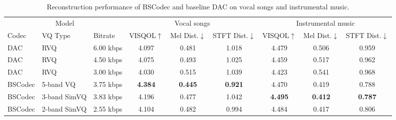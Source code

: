 \documentclass[11pt]{article}
\begin{document}
\begin{table}[h]
\centering
\small
\setlength{\tabcolsep}{4pt}
\caption{Reconstruction performance of BSCodec and baseline DAC on vocal songs and instrumental music.}
\vspace{-10pt}
\label{tab:music_instrument_results}
\begin{tabular}{lllcccccc}
\toprule
\multicolumn{3}{c}{Model} & \multicolumn{3}{c}{Vocal songs} & \multicolumn{3}{c}{Instrumental music} \\
\cmidrule(lr){1-3} \cmidrule(lr){4-6} \cmidrule(lr){7-9}
Codec & VQ Type & Bitrate & VISQOL$\uparrow$ & Mel Dist.$\downarrow$ & STFT Dist.$\downarrow$ & VISQOL$\uparrow$ & Mel Dist.$\downarrow$ & STFT Dist.$\downarrow$ \\
\midrule
DAC & RVQ & 6.00 kbps & 4.097 & 0.481 & 1.018 & 4.479 & 0.506 & 0.959 \\
DAC & RVQ & 4.50 kbps & 4.075 & 0.493 & 1.025 & 4.459 & 0.517 & 0.962
\\
DAC & RVQ & 3.00 kbps & 4.030 & 0.515 & 1.039 & 4.423 & 0.541 & 0.968
\\
BSCodec & 5-band VQ & 3.75 kbps & \textbf{4.384} & \textbf{0.445} & \textbf{0.921} & 4.470 & 0.419 & 0.788 \\
BSCodec & 3-band SimVQ & 3.83 kbps & 4.196 & 0.477 & 1.042 & \textbf{4.495} & \textbf{0.412} & \textbf{0.787} \\
BSCodec & 2-band SimVQ & 2.55 kbps & 4.104 & 0.482 & 0.994 & 4.484 & 0.417 & 0.806 \\
\bottomrule
\end{tabular}
\vspace{-10pt}
\end{table}

\end{document}
